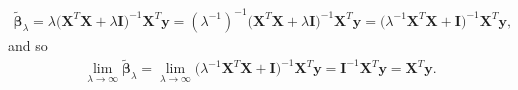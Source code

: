 \documentclass[10pt]{article}
\begin{document}
\begin{itemize}
    \begin{align*}
        \tilde{\bm{\beta}}_{\lambda}
        = \lambda \big( \mathbf{X}^T \mathbf{X} + \lambda \mathbf{I} \big)^{-1} \mathbf{X}^T \mathbf{y}
        = (\lambda^{-1})^{-1} \big( \mathbf{X}^T \mathbf{X} + \lambda \mathbf{I} \big)^{-1} \mathbf{X}^T \mathbf{y} 
        = \big( \lambda^{-1} \mathbf{X}^T \mathbf{X} + \mathbf{I} \big)^{-1} \mathbf{X}^T \mathbf{y},
    \end{align*}
    and so 
    \begin{align*}
        \lim_{\lambda \to \infty} \tilde{\bm{\beta}}_{\lambda}
        = \lim_{\lambda \to \infty} \big( \lambda^{-1} \mathbf{X}^T \mathbf{X} + \mathbf{I} \big)^{-1} \mathbf{X}^T \mathbf{y}
        = \mathbf{I}^{-1} \mathbf{X}^T \mathbf{y}
        = \mathbf{X}^T \mathbf{y}.
    \end{align*}
\end{itemize}
\end{document}
